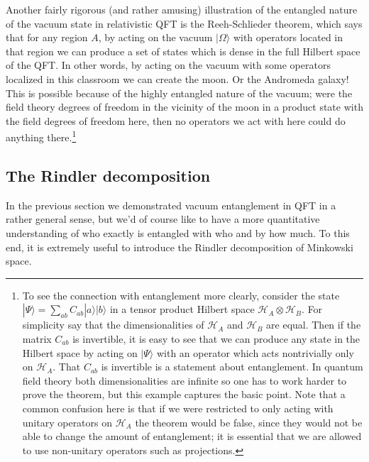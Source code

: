 \documentclass[12pt]{article}
\newcommand{\HA}{\mathcal{H}_A}
\newcommand{\HB}{\mathcal{H}_B}
\newcommand{\ran}{\rangle}
\begin{document}
Another fairly rigorous (and rather amusing) illustration of the entangled nature of the vacuum state in relativistic QFT is the Reeh-Schlieder theorem\cite{Streater:1989vi}, which says that for any region $A$, by acting on the vacuum $|\Omega\ran$ with operators located in that region we can produce a set of states which is dense in the full Hilbert space of the QFT.  In other words, by acting on the vacuum with some operators localized in this classroom we can create the moon.  Or the Andromeda galaxy!  This is possible because of the highly entangled nature of the vacuum; were the field theory degrees of freedom in the vicinity of the moon in a product state with the field degrees of freedom here, then no operators we act with here could do anything there.\footnote{To see the connection with entanglement more clearly, consider the state $|\Psi\ran=\sum_{ab}C_{ab}|a\ran|b\ran$ in a tensor product Hilbert space $\HA \otimes \HB$.  For simplicity say that the dimensionalities of $\HA$ and $\HB$ are equal.  Then if the matrix $C_{ab}$ is invertible, it is easy to see that we can produce any state in the Hilbert space by acting on $|\Psi\ran$ with an operator which acts nontrivially only on $\HA$.  That $C_{ab}$ is invertible is a statement about entanglement.  In quantum field theory both dimensionalities are infinite so one has to work harder to prove the theorem, but this example captures the basic point.  Note that a common confusion here is that if we were restricted to only acting with unitary operators on $\HA$ the theorem would be false, since they would not be able to change the amount of entanglement; it is essential that we are allowed to use non-unitary operators such as projections.}



\subsection{The Rindler decomposition}\label{rindsec1}
In the previous section we demonstrated vacuum entanglement in QFT in a rather general sense, but we'd of course like to have a more quantitative understanding of who exactly is entangled with who and by how much.  To this end, it is extremely useful to introduce the Rindler decomposition of Minkowski space.
\end{document}
